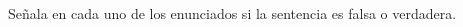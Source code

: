 Señala en cada uno de los enunciados si la sentencia es falsa o verdadera.

\begin{multicols}{2}
\end{multicols}
